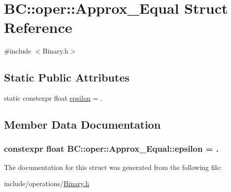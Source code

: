 \hypertarget{structBC_1_1oper_1_1Approx__Equal}{}\section{BC\+:\+:oper\+:\+:Approx\+\_\+\+Equal Struct Reference}
\label{structBC_1_1oper_1_1Approx__Equal}


{\ttfamily \#include $<$Binary.\+h$>$}

\subsection*{Static Public Attributes}
\begin{DoxyCompactItemize}
\item 
static constexpr float \hyperlink{structBC_1_1oper_1_1Approx__Equal_aea4741204c2cf7f998bd3f48ac0bd04e}{epsilon} = .
\end{DoxyCompactItemize}


\subsection{Member Data Documentation}
\subsubsection[{\texorpdfstring{epsilon}{epsilon}}]{\setlength{\rightskip}{0pt plus 5cm}constexpr float B\+C\+::oper\+::\+Approx\+\_\+\+Equal\+::epsilon = .\hspace{0.3cm}{\ttfamily [static]}}\hypertarget{structBC_1_1oper_1_1Approx__Equal_aea4741204c2cf7f998bd3f48ac0bd04e}{}\label{structBC_1_1oper_1_1Approx__Equal_aea4741204c2cf7f998bd3f48ac0bd04e}


The documentation for this struct was generated from the following file\+:\begin{DoxyCompactItemize}
\item 
include/operations/\hyperlink{Binary_8h}{Binary.\+h}\end{DoxyCompactItemize}
